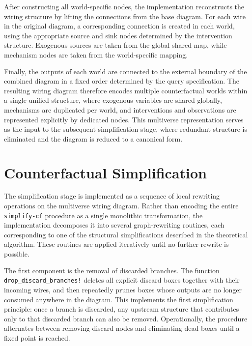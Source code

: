 \documentclass[a4paper]{report}
\begin{document}
After constructing all world-specific nodes, the implementation reconstructs the wiring structure by lifting the connections from the base diagram. For each wire in the original diagram, a corresponding connection is created in each world, using the appropriate source and sink nodes determined by the intervention structure. Exogenous sources are taken from the global shared map, while mechanism nodes are taken from the world-specific mapping.

Finally, the outputs of each world are connected to the external boundary of the combined diagram in a fixed order determined by the query specification. The resulting wiring diagram therefore encodes multiple counterfactual worlds within a single unified structure, where exogenous variables are shared globally, mechanisms are duplicated per world, and interventions and observations are represented explicitly by dedicated nodes. This multiverse representation serves as the input to the subsequent simplification stage, where redundant structure is eliminated and the diagram is reduced to a canonical form.

\section{Counterfactual Simplification}

The simplification stage is implemented as a sequence of local rewriting operations on the multiverse wiring diagram. 
Rather than encoding the entire \texttt{simplify-cf} procedure as a single monolithic transformation, the implementation decomposes it into several graph-rewriting routines, each corresponding to one of the structural simplifications described in the theoretical algorithm. 
These routines are applied iteratively until no further rewrite is possible.

The first component is the removal of discarded branches. 
The function \texttt{drop\_discard\_branches!} deletes all explicit discard boxes together with their incoming wires, and then repeatedly prunes boxes whose outputs are no longer consumed anywhere in the diagram. This implements the first simplification principle: once a branch is discarded, any upstream structure that contributes only to that discarded branch can also be removed. Operationally, the procedure alternates between removing discard nodes and eliminating dead boxes until a fixed point is reached.
\end{document}
